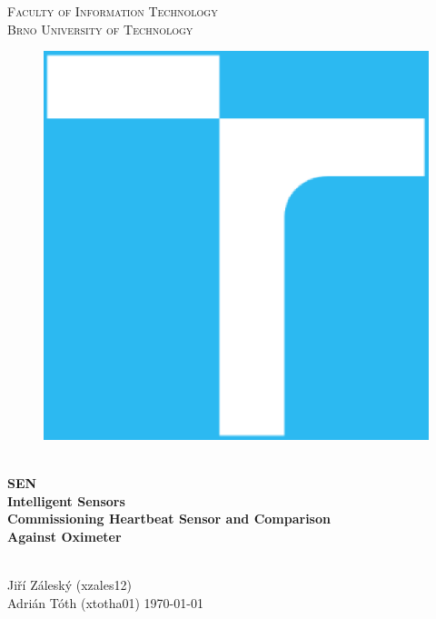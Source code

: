 \documentclass[11pt,a4paper]{article}
\begin{document}


\begin{titlepage}
    \begin{center}
        \Huge
        \textsc{
            Faculty of Information Technology\\
            Brno University of Technology
        }
        \vspace{80px}
        \begin{figure}[!h]
            \centering
            \includegraphics[scale=0.3]{img/vutbr-fit-logo.eps}
        \end{figure}
        \\[15mm]
        \Huge{
            \textbf{
                SEN
            }
        }
        \\[1.5mm]
        \huge{
            \textbf{
                Intelligent Sensors
            }
        }
        \\[2.5em]
        \LARGE{
            \textbf{
                Commissioning Heartbeat Sensor and Comparison\\
                Against Oximeter
            }
        }
        \vfill
    \end{center}
        \Large{
            \hfill\\
            Jiří Záleský (xzales12)\\
            Adrián Tóth (xtotha01) \hfill \today
        }

\end{titlepage}
\end{document}
